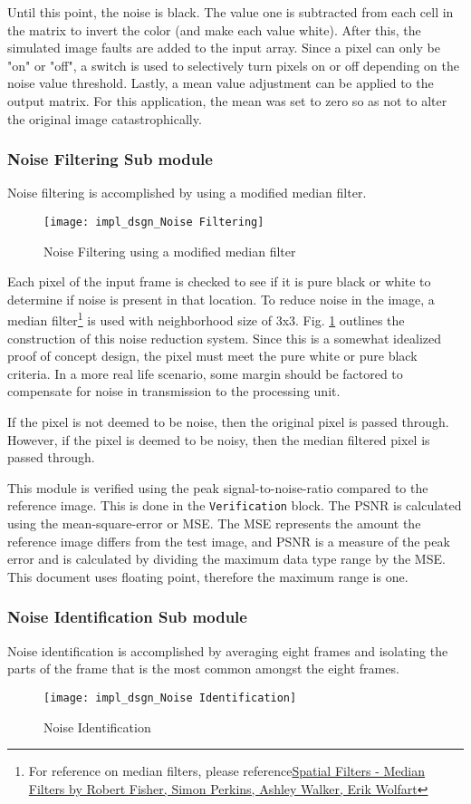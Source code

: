 \par Until this point, the noise is black. The value one is subtracted from each cell in the matrix to invert the color (and make each value white). After this, the simulated image faults are added to the input array. Since a pixel can only be "on" or "off", a switch is used to selectively turn pixels on or off depending on the noise value threshold. Lastly, a mean value adjustment can be applied to the output matrix. For this application, the mean was set to zero so as not to alter the original image catastrophically.

\subsubsection{Noise Filtering Sub module}
Noise filtering is accomplished by using a modified median filter.
\begin{figure}[H]
    \texttt{[image: impl\_dsgn\_Noise Filtering]}
    \caption{Noise Filtering using a modified median filter}
    \label{fig:medianFilter}
\end{figure}
 \par Each pixel of the input frame is checked to see if it is pure black or white to determine if noise is present in that location. To reduce noise in the image, a median filter\footnote{For reference on median filters, please reference\hyperlink{https://homepages.inf.ed.ac.uk/rbf/HIPR2/median.htm}{Spatial Filters - Median Filters by Robert Fisher, Simon Perkins, Ashley Walker, Erik Wolfart}} is used with neighborhood size of 3x3. Fig. \ref{fig:medianFilter} outlines the construction of this noise reduction system. Since this is a somewhat idealized proof of concept design, the pixel must meet the pure white or pure black criteria. In a more real life scenario, some margin should be factored to compensate for noise in transmission to the processing unit.
 \par If the pixel is not deemed to be noise, then the original pixel is passed through. However, if the pixel is deemed to be noisy,  then the median filtered pixel is passed through.
 \par This module is verified using the peak signal-to-noise-ratio compared to the reference image. This is done in the \verb!Verification! block. The PSNR is calculated using the mean-square-error or MSE. The MSE represents the amount the reference image differs from the test image, and PSNR is a measure of the peak error and is calculated by dividing the maximum data type range by the MSE. This document uses floating point, therefore the maximum range is one\cite{mathworks}.
 \subsubsection{Noise Identification Sub module}
 Noise identification is accomplished by averaging eight frames and isolating the parts of the frame that is the most common amongst the eight frames.
 \begin{figure}[H]
    \texttt{[image: impl\_dsgn\_Noise Identification]}
    \caption{Noise Identification}
    \label{fig:noiseID}
\end{figure}
